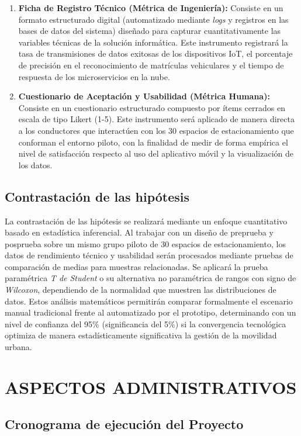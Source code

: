 \documentclass[12pt,a4paper]{article}
\begin{document}
\begin{enumerate}
	\item \textbf{Ficha de Registro Técnico (Métrica de Ingeniería):} Consiste en un formato estructurado digital (automatizado mediante \textit{logs} y registros en las bases de datos del sistema) diseñado para capturar cuantitativamente las variables técnicas de la solución informática. Este instrumento registrará la tasa de transmisiones de datos exitosas de los dispositivos IoT, el porcentaje de precisión en el reconocimiento de matrículas vehiculares y el tiempo de respuesta de los microservicios en la nube.
	\item \textbf{Cuestionario de Aceptación y Usabilidad (Métrica Humana):} Consiste en un cuestionario estructurado compuesto por ítems cerrados en escala de tipo Likert (1-5). Este instrumento será aplicado de manera directa a los conductores que interactúen con los 30 espacios de estacionamiento que conforman el entorno piloto, con la finalidad de medir de forma empírica el nivel de satisfacción respecto al uso del aplicativo móvil y la visualización de los datos.
\end{enumerate}

\subsection{Contrastación de las hipótesis}
La contrastación de las hipótesis se realizará mediante un enfoque cuantitativo basado en estadística inferencial. Al trabajar con un diseño de preprueba y posprueba sobre un mismo grupo piloto de 30 espacios de estacionamiento, los datos de rendimiento técnico y usabilidad serán procesados mediante pruebas de comparación de medias para muestras relacionadas. Se aplicará la prueba paramétrica \textit{T de Student} o su alternativa no paramétrica de rangos con signo de \textit{Wilcoxon}, dependiendo de la normalidad que muestren las distribuciones de datos. Estos análisis matemáticos permitirán comparar formalmente el escenario manual tradicional frente al automatizado por el prototipo, determinando con un nivel de confianza del 95\% (significancia del 5\%) si la convergencia tecnológica optimiza de manera estadísticamente significativa la gestión de la movilidad urbana.

\clearpage
\section{ASPECTOS ADMINISTRATIVOS}

\subsection{Cronograma de ejecución del Proyecto}
\end{document}

